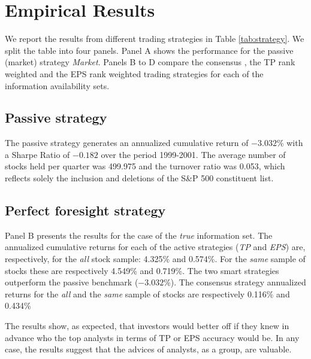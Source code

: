 \documentclass{article}\usepackage[]{graphicx}\usepackage[]{color}
\newcommand{\tr}{\textit{true}}
\newcommand{\same}{\textit{same}}
\newcommand{\all}{\textit{all}}
\begin{document}
{%

\section{Empirical Results}
\label{sec:results}

We report the results from different trading strategies in Table \ref{tab:strategy}. We split the table into four panels. Panel A shows  the performance for  the passive (market) strategy \textit{Market}. Panels B to D compare the consensus , the TP rank weighted and the EPS rank weighted trading strategies for each of the information availability sets. 


\subsection{Passive strategy}

The passive strategy generates an annualized cumulative return of \ensuremath{-3.032}\% with a Sharpe Ratio  of \ensuremath{-0.182} over the period 1999-2001. The average number of stocks held per quarter was 499.975 and the turnover ratio was 0.053, which reflects solely the inclusion and deletions  of the S\&P 500 constituent list.

\subsection{Perfect foresight strategy}
\label{sec:perfect}
Panel B presents the results for the case of the \tr{} information set. The annualized cumulative returns for each of the active strategies (\textit{TP} and \textit{EPS}) are, respectively, for the \all{} stock sample: 4.325\% and  0.574\%. For the \same{} sample of stocks these are respectively 4.549\% and 0.719\%. The two smart strategies outperform the passive benchmark (\ensuremath{-3.032}\%).  The consensus strategy annualized returns for the \all{} and the \same{} sample of stocks are respectively   0.116\% and  0.434\%


The results show, as expected, that  investors would better off if they knew in advance who the top analysts in terms of TP or EPS accuracy would be. In any case, the results suggest that the advices of analysts, as a group, are valuable. 


}
\end{document}
